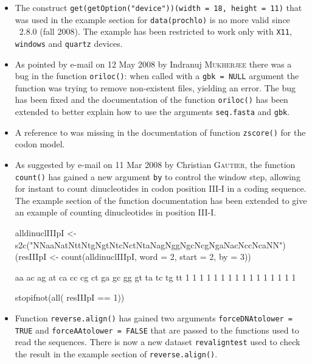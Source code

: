 \documentclass{article}
\begin{document}
\begin{itemize}

\item The construct \texttt{get(getOption("device"))(width = 18, height = 11)}
  that was used in the example section for \texttt{data(prochlo)} is no
  more valid since \Rlogo{}~2.8.0 (fall 2008). The example has been
  restricted to work only with \texttt{X11}, \texttt{windows} and
  \texttt{quartz} devices.

\item As pointed by e-mail on 12 May 2008 by Indranuj \textsc{Mukherjee} there
  was a bug in the function \texttt{oriloc()}: when called with a
  \texttt{gbk = NULL} argument the function was trying to remove
  non-existent files, yielding an error. The bug has been fixed and
  the documentation of the function \texttt{oriloc()} has been
  extended to better explain how to use the arguments \texttt{seq.fasta}
  and \texttt{gbk}.

\item A reference to \cite{GautierC1985} was missing in the documentation
  of function \texttt{zscore()} for the codon model.

\item As suggested by e-mail on 11 Mar 2008 by Christian \textsc{Gautier},
  the function \texttt{count()}
  has gained a new argument \texttt{by} to control the window step,
  allowing for instant to count dinucleotides in codon position III-I
  in a coding sequence. The example section of the function documentation
  has been extended to give an example of counting dinucleotides in
  position III-I.

\begin{Schunk}
\begin{Sinput}
 alldinuclIIIpI <- s2c("NNaaNatNttNtgNgtNtcNctNtaNagNggNgcNcgNgaNacNccNcaNN")
 (resIIIpI <- count(alldinuclIIIpI, word = 2, start = 2, by = 3))
\end{Sinput}
\begin{Soutput}
aa ac ag at ca cc cg ct ga gc gg gt ta tc tg tt 
 1  1  1  1  1  1  1  1  1  1  1  1  1  1  1  1 
\end{Soutput}
\begin{Sinput}
 stopifnot(all( resIIIpI == 1))
\end{Sinput}
\end{Schunk}

\item Function \texttt{reverse.align()} has gained two arguments
  \texttt{forceDNAtolower = TRUE} and \texttt{forceAAtolower = FALSE}
  that are passed to the functions used to read the sequences.
  There is now a new dataset \texttt{revaligntest} used to check
  the result in the example section of \texttt{reverse.align()}.


\end{itemize}
\end{document}
